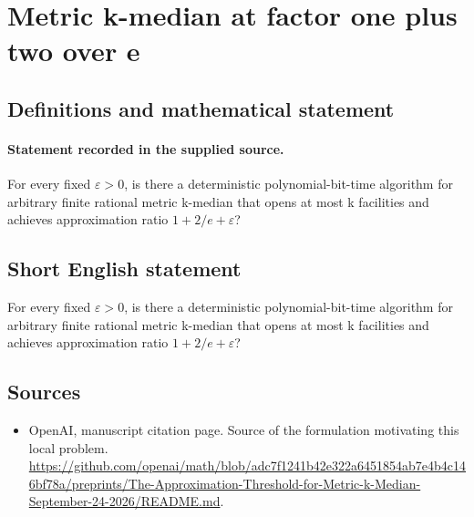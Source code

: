 \documentclass[11pt]{article}
\begin{document}
\section*{Metric k-median at factor one plus two over e}\label{30007465}
\subsection{Definitions and mathematical statement}
\paragraph{Statement recorded in the supplied source.}
For every fixed $\varepsilon >0$, is there a deterministic polynomial-bit-time algorithm for arbitrary finite rational metric k-median that opens at most k facilities and achieves approximation ratio $1+2/e+\varepsilon $?
\subsection{Short English statement}
For every fixed $\varepsilon >0$, is there a deterministic polynomial-bit-time algorithm for arbitrary finite rational metric k-median that opens at most k facilities and achieves approximation ratio $1+2/e+\varepsilon $?
\subsection{Sources}
\begin{itemize}
\item[S1] OpenAI, manuscript citation page. Source of the formulation motivating this local problem.
\url{https://github.com/openai/math/blob/adc7f1241b42e322a6451854ab7e4b4c146bf78a/preprints/The-Approximation-Threshold-for-Metric-k-Median-September-24-2026/README.md}.
\end{itemize}
\end{document}
